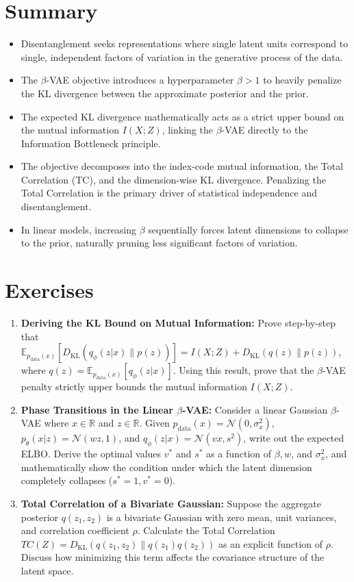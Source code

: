 \section{Summary}
\begin{itemize}
    \item Disentanglement seeks representations where single latent units correspond to single, independent factors of variation in the generative process of the data.
    \item The $\beta$-VAE objective introduces a hyperparameter $\beta > 1$ to heavily penalize the KL divergence between the approximate posterior and the prior.
    \item The expected KL divergence mathematically acts as a strict upper bound on the mutual information $I(X;Z)$, linking the $\beta$-VAE directly to the Information Bottleneck principle.
    \item The objective decomposes into the index-code mutual information, the Total Correlation (TC), and the dimension-wise KL divergence. Penalizing the Total Correlation is the primary driver of statistical independence and disentanglement.
    \item In linear models, increasing $\beta$ sequentially forces latent dimensions to collapse to the prior, naturally pruning less significant factors of variation.
\end{itemize}

\section*{Exercises}
\begin{enumerate}
    \item \textbf{Deriving the KL Bound on Mutual Information:} Prove step-by-step that $\mathbb{E}_{p_{\text{data}}(x)} [D_{\text{KL}}(q_\phi(z|x) \parallel p(z))] = I(X;Z) + D_{\text{KL}}(q(z) \parallel p(z))$, where $q(z) = \mathbb{E}_{p_{\text{data}}(x)}[q_\phi(z|x)]$. Using this result, prove that the $\beta$-VAE penalty strictly upper bounds the mutual information $I(X;Z)$.
    \item \textbf{Phase Transitions in the Linear $\beta$-VAE:} Consider a linear Gaussian $\beta$-VAE where $x \in \mathbb{R}$ and $z \in \mathbb{R}$. Given $p_{\text{data}}(x) = \mathcal{N}(0, \sigma_x^2)$, $p_\theta(x|z) = \mathcal{N}(w z, 1)$, and $q_\phi(z|x) = \mathcal{N}(v x, s^2)$, write out the expected ELBO. Derive the optimal values $v^*$ and $s^*$ as a function of $\beta, w$, and $\sigma_x^2$, and mathematically show the condition under which the latent dimension completely collapses ($s^* = 1, v^* = 0$).
    \item \textbf{Total Correlation of a Bivariate Gaussian:} Suppose the aggregate posterior $q(z_1, z_2)$ is a bivariate Gaussian with zero mean, unit variances, and correlation coefficient $\rho$. Calculate the Total Correlation $TC(Z) = D_{\text{KL}}(q(z_1, z_2) \parallel q(z_1)q(z_2))$ as an explicit function of $\rho$. Discuss how minimizing this term affects the covariance structure of the latent space.
\end{enumerate}

